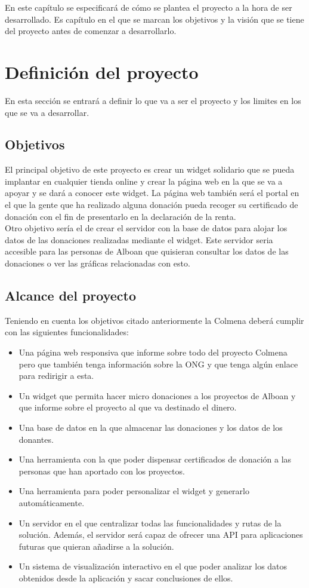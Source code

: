 En este capítulo se especificará de cómo se plantea el proyecto a la hora de ser desarrollado. Es capítulo en el que se marcan los objetivos y la visión que se tiene del proyecto antes de comenzar a desarrollarlo.

\section{Definición del proyecto}
En esta sección se entrará a definir lo que va a ser el proyecto y los limites en los que se va a desarrollar.

\subsection{Objetivos}
El principal objetivo de este proyecto es crear un widget solidario que se pueda implantar en cualquier tienda online y crear la página web en la que se va a apoyar y se dará a conocer este widget. La página web también será el portal en el que la gente que ha realizado alguna donación pueda recoger su certificado de donación con el fin de presentarlo en la declaración de la renta.\\

Otro objetivo sería el de crear el servidor con la base de datos para alojar los datos de las donaciones realizadas mediante el widget. Este servidor seria accesible para las personas de Alboan que quisieran consultar los datos de las donaciones o ver las gráficas relacionadas con esto.

\subsection{Alcance del proyecto}
Teniendo en cuenta los objetivos citado anteriormente la Colmena deberá cumplir con las siguientes funcionalidades:

\begin{itemize}
	\item Una página web responsiva que informe sobre todo del proyecto Colmena pero que también tenga información sobre la ONG y que tenga algún enlace para redirigir a esta.
	\item Un widget que permita hacer micro donaciones a los proyectos de Alboan y que informe sobre el proyecto al que va destinado el dinero.
	\item Una base de datos en la que almacenar las donaciones y los datos de los donantes.
	\item Una herramienta con la que poder dispensar certificados de donación a las personas que han aportado con los proyectos.
	\item Una herramienta para poder personalizar el widget y generarlo automáticamente.
	\item Un servidor en el que centralizar todas las funcionalidades y rutas de la solución. Además, el servidor será capaz de ofrecer una API para aplicaciones futuras que quieran añadirse a la solución.
	\item Un sistema de visualización interactivo en el que poder analizar los datos obtenidos desde la aplicación y sacar conclusiones de ellos.
\end{itemize}

